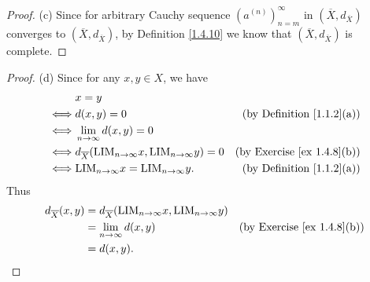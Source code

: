\begin{proof}{(c)}
    Since for arbitrary Cauchy sequence \((a^{(n)})_{n = m}^\infty\) in \((\overline{X}, d_{\overline{X}})\) converges to \((\overline{X}, d_{\overline{X}})\), by Definition \ref{1.4.10} we know that \((\overline{X}, d_{\overline{X}})\) is complete.
\end{proof}

\begin{proof}{(d)}
    Since for any \(x, y \in X\), we have
    \begin{align*}
             & x = y                                                                                                                   \\
        \iff & d(x, y) = 0                                                                    & \text{(by Definition \ref{1.1.2}(a))}  \\
        \iff & \lim_{n \to \infty} d(x, y) = 0                                                                                         \\
        \iff & d_{\overline{X}}(\text{LIM}_{n \to \infty} x, \text{LIM}_{n \to \infty} y) = 0 & \text{(by Exercise \ref{ex 1.4.8}(b))} \\
        \iff & \text{LIM}_{n \to \infty} x = \text{LIM}_{n \to \infty} y.                     & \text{(by Definition \ref{1.1.2}(a))}
    \end{align*}
    Thus
    \begin{align*}
        d_{\overline{X}}(x, y) & = d_{\overline{X}}(\text{LIM}_{n \to \infty} x, \text{LIM}_{n \to \infty} y)                                          \\
                               & = \lim_{n \to \infty} d(x, y)                                                & \text{(by Exercise \ref{ex 1.4.8}(b))} \\
                               & = d(x, y).
    \end{align*}
\end{proof}


